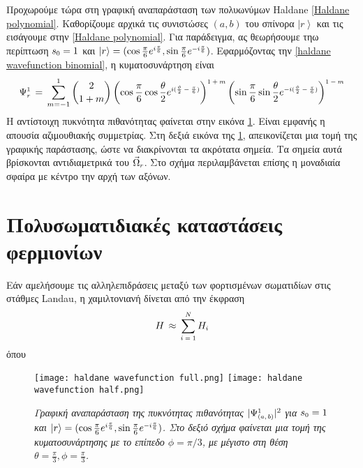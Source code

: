Προχωρούμε τώρα στη γραφική αναπαράσταση των πολυωνύμων Haldane \eqref{Haldane polynomial}. Καθορίζουμε αρχικά τις συνιστώσες $(a,b)$ του σπίνορα $\left| r\right>$ και τις εισάγουμε στην \eqref{Haldane polynomial}. 
Για παράδειγμα, ας θεωρήσουμε τηω περίπτωση $s\subscr{0}=1$ και $\left|r\right>=(\cos\frac{\pi}{6}e\superscr{i\frac{\pi}{6}},\sin\frac{\pi}{6}e\superscr{-i\frac{\pi}{6}})$. Εφαρμόζοντας την \eqref{haldane wavefunction binomial}, η κυματοσυνάρτηση είναι
\begin{equation}
    \Psi\superscr{1}\subscr{r}\,=\,\sum\limits_{m=-1}^{1}\binom{2}{1+m}\left( \cos\frac{\pi}{6}\cos\frac{\theta}{2}e\superscr{i(\frac{\phi}{2}-\frac{\pi}{6})} \right)\superscr{1+m}\left( \sin\frac{\pi}{6}\sin\frac{\theta}{2} e\superscr{-i(\frac{\phi}{2}-\frac{\pi}{6})} \right)\superscr{1-m}
\end{equation}
Η αντίστοιχη πυκνότητα πιθανότητας φαίνεται στην εικόνα \ref{fig:haldane wavefunction s=1}. Είναι εμφανής η απουσία αζιμουθιακής συμμετρίας. Στη δεξιά εικόνα της \ref{fig:haldane wavefunction s=1}, απεικονίζεται μια τομή της γραφικής παράστασης, ώστε να διακρίνονται τα ακρότατα σημεία. Τα σημεία αυτά βρίσκονται αντιδιαμετρικά του $\vec{\Omega}\subscr{r}$. 
Στο σχήμα περιλαμβάνεται επίσης η μοναδιαία σφαίρα με κέντρο την αρχή των αξόνων.

\section{Πολυσωματιδιακές καταστάσεις φερμιονίων}
 Εάν αμελήσουμε τις αλληλεπιδράσεις μεταξύ των φορτισμένων σωματιδίων στις στάθμες Landau, η χαμιλτονιανή 
 δίνεται από την έκφραση
\begin{equation*}
    H\,\approx\,\sum\subscr{i=1}\superscr{N}H\subscr{i}
\end{equation*}
όπου
\begin{figure}[t] 
    \centering
    \texttt{[image: haldane wavefunction full.png]}
    \texttt{[image: haldane wavefunction half.png]}
    \caption{\textit{Γραφική αναπαράσταση της πυκνότητας πιθανότητας $|\Psi\superscr{1}\subscr{(a,b)}|^2$ για $s\subscr{0}=1$ και $\left|r\right>=(\cos\frac{\pi}{6}e\superscr{i\frac{\pi}{6}},\sin\frac{\pi}{6}e\superscr{-i\frac{\pi}{6}})$. Στο δεξιό σχήμα φαίνεται μια τομή της κυματοσυνάρτησης με το επίπεδο $\phi=\pi/3$, με μέγιστο στη θέση $\theta=\frac{\pi}{3},\phi=\frac{\pi}{3}$.}}
    \label{fig:haldane wavefunction s=1}
\end{figure}


